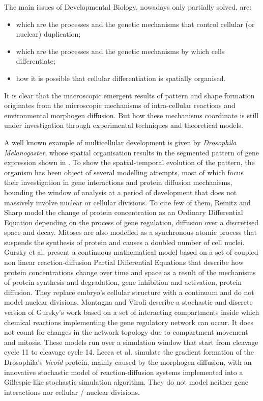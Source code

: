 \documentclass[12pt,a4paper,twoside,openright]{book}
\begin{document}
The main issues of Developmental Biology, nowadays only partially solved, are:
\begin{itemize}
 \item which are the processes and the genetic mechanisms that control cellular (or nuclear) duplication;
 \item which are the processes and the genetic mechanisms by which cells differentiate;
 \item how it is possible that cellular differentiation is spatially organised.
\end{itemize}

It is clear that the macroscopic emergent results of pattern and shape formation originates from the microscopic mechanisms of intra-cellular reactions and environmental morphogen diffusion.
%
But how these mechanisms coordinate is still under investigation through experimental techniques and theoretical models.

A well known example of multicellular development is given by \emph{Drosophila Melanogaster}, whose spatial organisation results in the segmented pattern of gene expression shown in  . 
%
To show the spatial-temporal evolution of the pattern, the organism has been object of several modelling attempts, most of which focus their investigation in gene interactions and protein diffusion mechanisms, bounding the window of analysis at a period of development that does not massively involve nuclear or cellular divisions. 
%
To cite few of them, Reinitz and Sharp \cite{reinitz95} model the change of protein concentration as an Ordinary Differential Equation depending on the process of gene regulation, diffusion over a  discretised space and decay.
%
Mitoses are also modelled as a synchronous  atomic process that suspends the synthesis of protein and causes a doubled number of cell nuclei.
%
Gursky et al. \cite{gursky04} present a continuous mathematical model based on a set of coupled non linear reaction-diffusion Partial Differential Equations that describe how protein concentrations change over time and space as a result of the mechanisms of protein synthesis and degradation, gene inhibition and activation, protein diffusion. They replace embryo's cellular structure with a continuum and do not model nuclear divisions.
%
%
Montagna and Viroli \cite{montagna-cs2bio10} describe a stochastic and discrete version of Gursky's work based on a set of interacting compartments inside which chemical reactions implementing the gene regulatory network can occur. It does not count for changes in the network topology due to compartment movement and mitosis.
%
These models run over a simulation window that start from cleavage cycle 11 to cleavage cycle 14.
%
Lecca et al. \cite{LeccaJIB2010} simulate the gradient formation of the Drosophila's \emph{bicoid} protein, mainly caused by the morphogen diffusion, with an innovative stochastic model of reaction-diffusion systems implemented into a Gillespie-like stochastic simulation algorithm.
%
They do not model neither gene interactions nor cellular / nuclear divisions.
%
\end{document}
